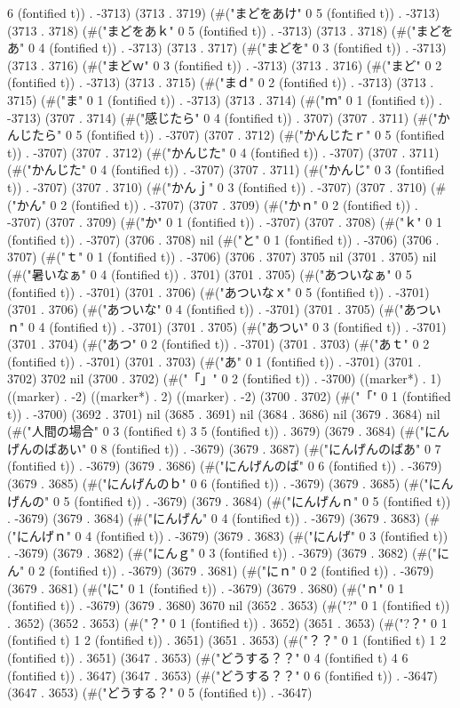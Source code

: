 6 (fontified t)) . -3713) (3713 . 3719) (#("まどをあけ" 0 5 (fontified t)) . -3713) (3713 . 3718) (#("まどをあｋ" 0 5 (fontified t)) . -3713) (3713 . 3718) (#("まどをあ" 0 4 (fontified t)) . -3713) (3713 . 3717) (#("まどを" 0 3 (fontified t)) . -3713) (3713 . 3716) (#("まどｗ" 0 3 (fontified t)) . -3713) (3713 . 3716) (#("まど" 0 2 (fontified t)) . -3713) (3713 . 3715) (#("まｄ" 0 2 (fontified t)) . -3713) (3713 . 3715) (#("ま" 0 1 (fontified t)) . -3713) (3713 . 3714) (#("ｍ" 0 1 (fontified t)) . -3713) (3707 . 3714) (#("感じたら" 0 4 (fontified t)) . 3707) (3707 . 3711) (#("かんじたら" 0 5 (fontified t)) . -3707) (3707 . 3712) (#("かんじたｒ" 0 5 (fontified t)) . -3707) (3707 . 3712) (#("かんじた" 0 4 (fontified t)) . -3707) (3707 . 3711) (#("かんじた" 0 4 (fontified t)) . -3707) (3707 . 3711) (#("かんじ" 0 3 (fontified t)) . -3707) (3707 . 3710) (#("かんｊ" 0 3 (fontified t)) . -3707) (3707 . 3710) (#("かん" 0 2 (fontified t)) . -3707) (3707 . 3709) (#("かｎ" 0 2 (fontified t)) . -3707) (3707 . 3709) (#("か" 0 1 (fontified t)) . -3707) (3707 . 3708) (#("ｋ" 0 1 (fontified t)) . -3707) (3706 . 3708) nil (#("と" 0 1 (fontified t)) . -3706) (3706 . 3707) (#("ｔ" 0 1 (fontified t)) . -3706) (3706 . 3707) 3705 nil (3701 . 3705) nil (#("暑いなぁ" 0 4 (fontified t)) . 3701) (3701 . 3705) (#("あついなぁ" 0 5 (fontified t)) . -3701) (3701 . 3706) (#("あついなｘ" 0 5 (fontified t)) . -3701) (3701 . 3706) (#("あついな" 0 4 (fontified t)) . -3701) (3701 . 3705) (#("あついｎ" 0 4 (fontified t)) . -3701) (3701 . 3705) (#("あつい" 0 3 (fontified t)) . -3701) (3701 . 3704) (#("あつ" 0 2 (fontified t)) . -3701) (3701 . 3703) (#("あｔ" 0 2 (fontified t)) . -3701) (3701 . 3703) (#("あ" 0 1 (fontified t)) . -3701) (3701 . 3702) 3702 nil (3700 . 3702) (#("「」" 0 2 (fontified t)) . -3700) ((marker*) . 1) ((marker) . -2) ((marker*) . 2) ((marker) . -2) (3700 . 3702) (#("「" 0 1 (fontified t)) . -3700) (3692 . 3701) nil (3685 . 3691) nil (3684 . 3686) nil (3679 . 3684) nil (#("人間の場合" 0 3 (fontified t) 3 5 (fontified t)) . 3679) (3679 . 3684) (#("にんげんのばあい" 0 8 (fontified t)) . -3679) (3679 . 3687) (#("にんげんのばあ" 0 7 (fontified t)) . -3679) (3679 . 3686) (#("にんげんのば" 0 6 (fontified t)) . -3679) (3679 . 3685) (#("にんげんのｂ" 0 6 (fontified t)) . -3679) (3679 . 3685) (#("にんげんの" 0 5 (fontified t)) . -3679) (3679 . 3684) (#("にんげんｎ" 0 5 (fontified t)) . -3679) (3679 . 3684) (#("にんげん" 0 4 (fontified t)) . -3679) (3679 . 3683) (#("にんげｎ" 0 4 (fontified t)) . -3679) (3679 . 3683) (#("にんげ" 0 3 (fontified t)) . -3679) (3679 . 3682) (#("にんｇ" 0 3 (fontified t)) . -3679) (3679 . 3682) (#("にん" 0 2 (fontified t)) . -3679) (3679 . 3681) (#("にｎ" 0 2 (fontified t)) . -3679) (3679 . 3681) (#("に" 0 1 (fontified t)) . -3679) (3679 . 3680) (#("ｎ" 0 1 (fontified t)) . -3679) (3679 . 3680) 3670 nil (3652 . 3653) (#("?" 0 1 (fontified t)) . 3652) (3652 . 3653) (#("？" 0 1 (fontified t)) . 3652) (3651 . 3653) (#("?？" 0 1 (fontified t) 1 2 (fontified t)) . 3651) (3651 . 3653) (#("？？" 0 1 (fontified t) 1 2 (fontified t)) . 3651) (3647 . 3653) (#("どうする？？" 0 4 (fontified t) 4 6 (fontified t)) . 3647) (3647 . 3653) (#("どうする？？" 0 6 (fontified t)) . -3647) (3647 . 3653) (#("どうする？" 0 5 (fontified t)) . -3647) 